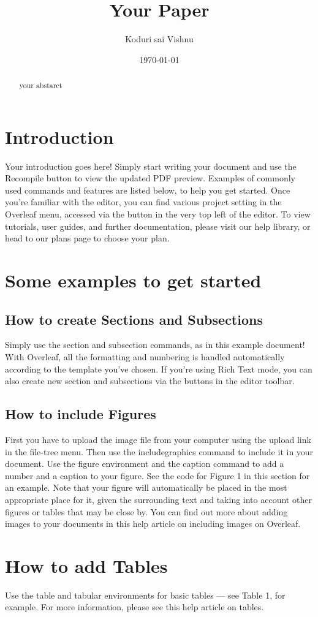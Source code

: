 \documentclass{article}
\title{Your Paper}
\author{Koduri sai Vishnu}
\date{\today}
\begin{document}
	\maketitle 
	
	\begin{abstract}
		your abstarct
	\end{abstract}
	\section{Introduction}
	Your introduction goes here! Simply start writing your document and use the Recompile button to
	view the updated PDF preview. Examples of commonly used commands and features are listed below,
	to help you get started.
	Once you’re familiar with the editor, you can find various project setting in the Overleaf menu,
	accessed via the button in the very top left of the editor. To view tutorials, user guides, and further
	documentation, please visit our help library, or head to our plans page to choose your plan.
	
	\section{ Some examples to get started}
	\subsection{How to create Sections and Subsections}
	Simply use the section and subsection commands, as in this example document! With Overleaf, all
	the formatting and numbering is handled automatically according to the template you’ve chosen. If
	you’re using Rich Text mode, you can also create new section and subsections via the buttons in the
	editor toolbar.
	\subsection{How to include Figures}
	First you have to upload the image file from your computer using the upload link in the file-tree menu.
	Then use the includegraphics command to include it in your document. Use the figure environment
	and the caption command to add a number and a caption to your figure. See the code for Figure 1 in
	this section for an example.
	Note that your figure will automatically be placed in the most appropriate place for it, given the
	surrounding text and taking into account other figures or tables that may be close by. You can find
	out more about adding images to your documents in this help article on including images on Overleaf.
	
	\section{ How to add Tables}
	Use the table and tabular environments for basic tables — see Table 1, for example. For more information, please see this help article on tables.
	

	
	
\end{document}

